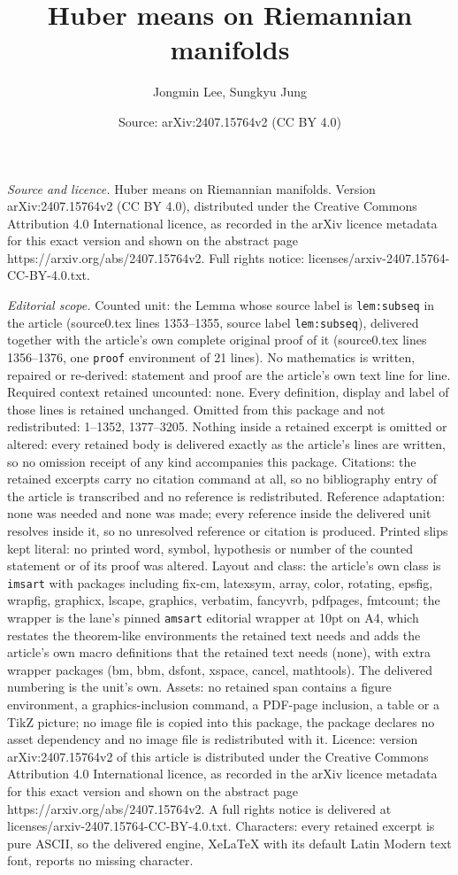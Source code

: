 \documentclass[10pt,a4paper]{amsart}
\title[Huber means on Riemannian manifolds]{Huber means on Riemannian manifolds}
\author{Jongmin Lee, Sungkyu Jung}
\date{Source: arXiv:2407.15764v2 (CC BY 4.0)}
\begin{document}
\maketitle

\noindent\emph{Source and licence.} Huber means on Riemannian manifolds. Version arXiv:2407.15764v2 (CC BY 4.0), distributed under the Creative Commons Attribution 4.0 International licence, as recorded in the arXiv licence metadata for this exact version and shown on the abstract page https://arxiv.org/abs/2407.15764v2. Full rights notice: licenses/arxiv-2407.15764-CC-BY-4.0.txt.\par\smallskip

\noindent\textit{Editorial scope.} Counted unit: the Lemma whose source label is \texttt{lem:subseq} in the article (source0.tex lines 1353--1355, source label \texttt{lem:subseq}), delivered together with the article's own complete original proof of it (source0.tex lines 1356--1376, one \texttt{proof} environment of 21 lines). No mathematics is written, repaired or re-derived: statement and proof are the article's own text line for line. Required context retained uncounted: none. Every definition, display and label of those lines is retained unchanged. Omitted from this package and not redistributed: 1--1352, 1377--3205. Nothing inside a retained excerpt is omitted or altered: every retained body is delivered exactly as the article's lines are written, so no omission receipt of any kind accompanies this package. Citations: the retained excerpts carry no citation command at all, so no bibliography entry of the article is transcribed and no reference is redistributed. Reference adaptation: none was needed and none was made; every reference inside the delivered unit resolves inside it, so no unresolved reference or citation is produced. Printed slips kept literal: no printed word, symbol, hypothesis or number of the counted statement or of its proof was altered. Layout and class: the article's own class is \texttt{imsart} with packages including fix-cm, latexsym, array, color, rotating, epsfig, wrapfig, graphicx, lscape, graphics, verbatim, fancyvrb, pdfpages, fmtcount; the wrapper is the lane's pinned \texttt{amsart} editorial wrapper at 10pt on A4, which restates the theorem-like environments the retained text needs and adds the article's own macro definitions that the retained text needs (none), with extra wrapper packages (bm, bbm, dsfont, xspace, cancel, mathtools). The delivered numbering is the unit's own. Assets: no retained span contains a figure environment, a graphics-inclusion command, a PDF-page inclusion, a table or a TikZ picture; no image file is copied into this package, the package declares no asset dependency and no image file is redistributed with it. Licence: version arXiv:2407.15764v2 of this article is distributed under the Creative Commons Attribution 4.0 International licence, as recorded in the arXiv licence metadata for this exact version and shown on the abstract page https://arxiv.org/abs/2407.15764v2. A full rights notice is delivered at licenses/arxiv-2407.15764-CC-BY-4.0.txt. Characters: every retained excerpt is pure ASCII, so the delivered engine, XeLaTeX with its default Latin Modern text font, reports no missing character.
\end{document}
